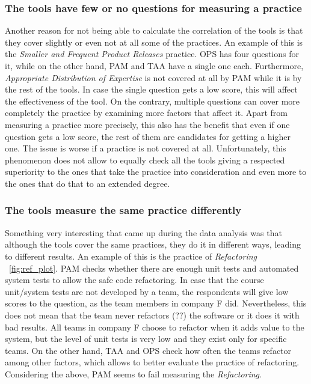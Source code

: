 \subsubsection{The tools have few or no questions for measuring a practice}
Another reason for not being able to calculate the correlation of the tools is that they cover slightly or even not at all some of the practices. An example of this is the \textit{Smaller and Frequent Product Releases} practice. OPS has four questions for it, while on the other hand, PAM and TAA have a single one each. Furthermore, \textit{Appropriate Distribution of Expertise} is not covered at all by PAM while it is by the rest of the tools. In case the single question gets a low score, this will affect the effectiveness of the tool. On the contrary, multiple questions can cover more completely the practice by examining more factors that affect it. Apart from measuring a practice more precisely, this also has the benefit that even if one question gets a low score, the rest of them are candidates for getting a higher one. The issue is worse if a practice is not covered at all. Unfortunately, this phenomenon does not allow to equally check all the tools giving a respected superiority to the ones that take the practice into consideration and even more to the ones that do that to an extended degree.

\subsubsection{The tools measure the same practice differently}
Something very interesting that came up during the data analysis was that although the tools cover the same practices, they do it in different ways, leading to different results. An example of this is the practice of \textit{Refactoring} ~\ref{fig:ref_plot}. PAM checks whether there are enough unit tests and automated system tests to allow the safe code refactoring. In case that the course unit/system tests are not developed by a team, the respondents will give low scores to the question, as the team members in company F did. Nevertheless, this does not mean that the team never refactors (??) the software or it does it with bad results. All teams in company F choose to refactor when it adds value to the system, but the level of unit tests is very low and they exist only for specific teams. On the other hand, TAA and OPS check how often the teams refactor among other factors, which allows to better evaluate the practice of refactoring. Considering the above, PAM seems to fail measuring the \textit{Refactoring}.

